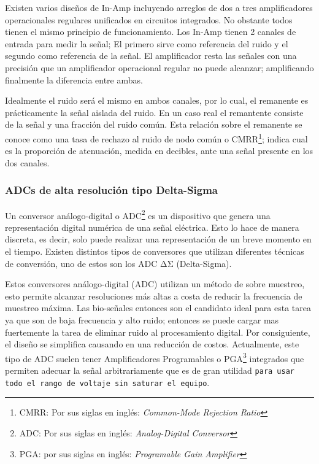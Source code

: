 Existen varios diseños de In-Amp incluyendo arreglos de dos a tres amplificadores operacionales regulares unificados en circuitos integrados. No obstante todos tienen el mismo principio de funcionamiento. Los In-Amp tienen 2 canales de entrada para medir la señal; El primero sirve como referencia del ruido y el segundo como referencia de la señal. El amplificador resta las señales con una precisión que un amplificador operacional regular no puede alcanzar; amplificando finalmente la diferencia entre ambas.

Idealmente el ruido será el mismo en ambos canales, por lo cual, el remanente es prácticamente la señal aislada del ruido. En un caso real el remantente consiste de la señal y una fracción del ruido común. Esta relación sobre el remanente se conoce como una tasa de rechazo al ruido de nodo común o CMRR\footnote{CMRR: Por sus siglas en inglés: \emph{Common-Mode Rejection Ratio}}; indica cual es la proporción de atenuación, medida en decibles, ante una señal presente en los dos canales.

\subsubsection{ADCs de alta resolución tipo Delta-Sigma}
\label{sec:org977e5be}
Un conversor análogo-digital o ADC\footnote{ADC: Por sus siglas en inglés: \emph{Analog-Digital Conversor}} es un dispositivo que genera una representación digital numérica de una señal eléctrica. Esto lo hace de manera discreta, es decir, solo puede realizar una representación de un breve momento en el tiempo. Existen distintos tipos de conversores que utilizan diferentes técnicas de conversión, uno de estos son los ADC ΔΣ (Delta-Sigma).

Estos conversores análogo-digital (ADC) utilizan un método de sobre muestreo, esto permite alcanzar resoluciones más altas a costa de reducir la frecuencia de muestreo máxima. Las bio-señales entonces son el candidato ideal para esta tarea ya que son de baja frecuencia y alto ruido; entonces se puede cargar mas fuertemente la tarea de eliminar ruido al procesamiento digital. Por consiguiente, el diseño se simplifica causando en una reducción de costos. Actualmente, este tipo de ADC suelen tener Amplificadores Programables o PGA\footnote{PGA: por sus siglas en inglés: \emph{Programable Gain Amplifier}} integrados que permiten adecuar la señal arbitrariamente que es de gran utilidad \texttt{para usar todo el rango de voltaje sin saturar el equipo}.

